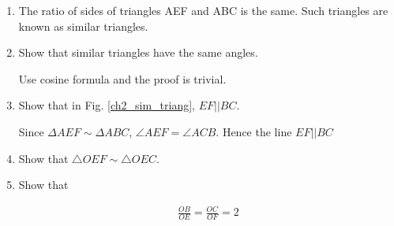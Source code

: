 \begin{enumerate}[label=\arabic*.,ref=\thesubsection.\theenumi]
\item
	The ratio of sides of triangles AEF and ABC is the same.  Such triangles are known as similar triangles.

\item
	Show that similar triangles have the same angles.

\solution Use cosine formula and the proof is trivial.
\item	Show that in Fig. \ref{ch2_sim_triang}, $EF || BC$.

\solution Since $\Delta AEF \sim \Delta ABC$, $\angle AEF = \angle ACB$.  Hence the line $EF||BC$
%
\item	Show that $\triangle OEF \sim \triangle OEC$.

\item Show that

	\begin{align}
	\frac{OB}{OE} = \frac{OC}{OF} = 2
	\end{align}

%
%

%
%		
%


\end{enumerate}
